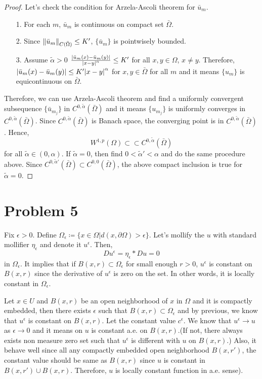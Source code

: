 \documentclass{article}
\begin{document}
\begin{proof}
Let's check the condition for Arzela-Ascoli theorem for $\bar{u}_m$.
\begin{enumerate}
\item[1.] For each $m$, $\bar{u}_m$ is continuous on compact set $\bar{\Omega}$.
\item[2.] Since $\norm{\bar{u}_m}_{C(\bar{\Omega})}\leq K'$, $\{\bar{u}_m\}$ is pointwisely bounded.
\item[3.] Assume $\tilde{\alpha}>0$ $\frac{\abs{\bar{u}_m(x)-\bar{u}_m(y)}}{\abs{x-y}^{\alpha}}\leq K'$ for all $x,y\in \Omega$, $x\neq y$. Therefore, $\abs{\bar{u}_m(x)-\bar{u}_m(y)}\leq K'\abs{x-y}^\alpha$ for $x,y\in \bar{\Omega}$ for all $m$ and it means $\{u_m\}$ is equicontinuous on $\bar{\Omega}$.
\end{enumerate}
Therefore, we can use Arzela-Ascoli theorem and find a uniformly convergent subsequence $\{\bar{u}_{m_j}\}$ in $C^{0, \tilde{\alpha}}(\bar{\Omega})$ and it means $\{u_{m_j}\}$ is uniformly converges in $C^{0, \tilde{\alpha}}(\bar{\Omega})$. Since $C^{0, \tilde{\alpha}}(\bar{\Omega})$ is Banach space, the converging point is in $C^{0, \tilde{\alpha}}(\bar{\Omega})$. Hence,
\begin{equation*}
W^{1,p}(\Omega)\subset\subset C^{0, \tilde{\alpha}}(\bar{\Omega})
\end{equation*}
for all $\tilde{\alpha}\in (0, \alpha)$. If $\tilde{\alpha}=0$, then find $0<\tilde{\alpha}'<\alpha$ and do the same procedure above. Since $C^{0, \tilde{\alpha}'}(\bar{\Omega})\subset C^{0, 0}(\bar{\Omega})$, the above compact inclusion  is true for $\tilde{\alpha}=0$.
\end{proof}
\section*{Problem 5}
Fix $\epsilon>0$. Define $\Omega_\epsilon\coloneqq\{x\in \Omega|d(x,\partial \Omega)>\epsilon\}$. Let's mollify the $u$ with standard mollifier $\eta_\epsilon$ and denote it $u^\epsilon$. Then,
\begin{equation*}
Du^\epsilon=\eta_\epsilon*Du=0
\end{equation*}
in $\Omega_\epsilon$. It implies that if $B(x, r)\subset \Omega_\epsilon$ for small enough $r>0$, $u^\epsilon$ is constant on $B(x,r)$ since the derivative of $u^\epsilon$ is zero on the set. In other words, it is locally constant in $\Omega_\epsilon$.

Let $x\in U$ and $B(x, r)$ be an open neighborhood of $x$ in $\Omega$ and it is compactly embedded, then there exists $\epsilon$ such that $B(x, r)\subset \Omega_\epsilon$ and by previous, we know that $u^\epsilon$ is constant on $B(x,r)$. Let the constant value $c^\epsilon$. We know that $u^\epsilon\rightarrow u$ as $\epsilon\rightarrow 0$ and it means on $u$ is constant a.e. on $B(x,r)$.(If not, there always exists non measure zero set such that $u^\epsilon$ is different with $u$ on $B(x,r)$.) Also, it behave well since all any compactly embedded open neighborhood $B(x, r')$, the constant value should be same as $B(x,r)$ since $u$ is constant in $B(x,r')\cup B(x,r)$. Therefore, $u$ is locally constant function in a.e. sense).
\end{document}
